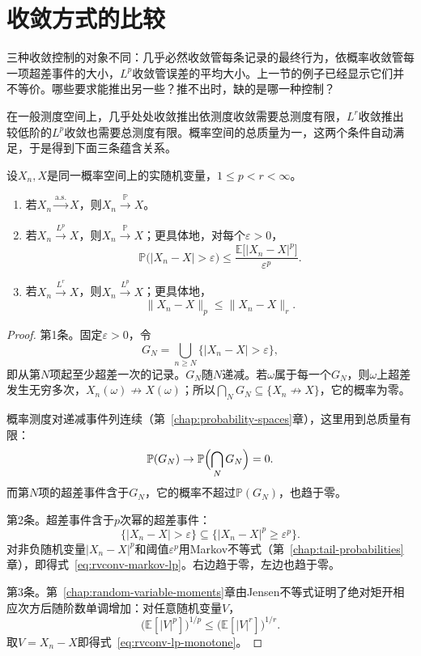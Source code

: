 \section{收敛方式的比较}
\label{sec:rvconv-comparison}

三种收敛控制的对象不同：几乎必然收敛管每条记录的最终行为，依概率收敛管每一项超差事件的大小，$L^{p}$收敛管误差的平均大小。上一节的例子已经显示它们并不等价。哪些要求能推出另一些？推不出时，缺的是哪一种控制？

在一般测度空间上，几乎处处收敛推出依测度收敛需要总测度有限，$L^{r}$收敛推出较低阶的$L^{p}$收敛也需要总测度有限。概率空间的总质量为一，这两个条件自动满足，于是得到下面三条蕴含关系。

\begin{theorem}[收敛方式的蕴含关系]
\label{thm:rvconv-implications}
设$X_n,X$是同一概率空间上的实随机变量，$1\leq p<r<\infty$。
\begin{enumerate}
 \item 若$X_n\xrightarrow{\mathrm{a.s.}}X$，则$X_n\xrightarrow{\mathbb{P}}X$。
 \item 若$X_n\xrightarrow{L^{p}}X$，则$X_n\xrightarrow{\mathbb{P}}X$；更具体地，对每个$\varepsilon>0$，
 \begin{equation}
  \mathbb{P}\bigl(\lvert X_n-X\rvert>\varepsilon\bigr)\leq\frac{\mathbb{E}\bigl[\lvert X_n-X\rvert^{p}\bigr]}{\varepsilon^{p}} .
  \label{eq:rvconv-markov-lp}
 \end{equation}
 \item 若$X_n\xrightarrow{L^{r}}X$，则$X_n\xrightarrow{L^{p}}X$；更具体地，
 \begin{equation}
  \lVert X_n-X\rVert_{p}\leq\lVert X_n-X\rVert_{r} .
  \label{eq:rvconv-lp-monotone}
 \end{equation}
\end{enumerate}
\end{theorem}

\begin{proof}
第1条。固定$\varepsilon>0$，令
\[
 G_N=\bigcup_{n\geq N}\bigl\{\lvert X_n-X\rvert>\varepsilon\bigr\},
\]
即从第$N$项起至少超差一次的记录。$G_N$随$N$递减。若$\omega$属于每一个$G_N$，则$\omega$上超差发生无穷多次，$X_n(\omega)\not\to X(\omega)$；所以$\bigcap_NG_N\subseteq\{X_n\not\to X\}$，它的概率为零。

概率测度对递减事件列连续（第~\ref{chap:probability-spaces}章），这里用到总质量有限：
\[
 \mathbb{P}(G_N)\to\mathbb{P}\Bigl(\bigcap_NG_N\Bigr)=0 .
\]
而第$N$项的超差事件含于$G_N$，它的概率不超过$\mathbb{P}(G_N)$，也趋于零。

第2条。超差事件含于$p$次幂的超差事件：
\[
 \{\lvert X_n-X\rvert>\varepsilon\}\subseteq\{\lvert X_n-X\rvert^{p}\geq\varepsilon^{p}\} .
\]
对非负随机变量$\lvert X_n-X\rvert^{p}$和阈值$\varepsilon^{p}$用Markov不等式（第~\ref{chap:tail-probabilities}章），即得式~\eqref{eq:rvconv-markov-lp}。右边趋于零，左边也趋于零。

第3条。第~\ref{chap:random-variable-moments}章由Jensen不等式证明了绝对矩开相应次方后随阶数单调增加：对任意随机变量$V$，
\[
 \bigl(\mathbb{E}[\lvert V\rvert^{p}]\bigr)^{1/p}\leq\bigl(\mathbb{E}[\lvert V\rvert^{r}]\bigr)^{1/r} .
\]
取$V=X_n-X$即得式~\eqref{eq:rvconv-lp-monotone}。
\end{proof}

